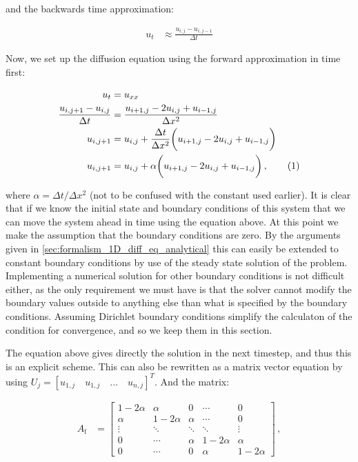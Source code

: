 \documentclass[reprint,english,notitlepage]{revtex4-1}  %
\newcommand\numberthis{\addtocounter{equation}{1}\tag{\theequation}}
\begin{document}
and the backwards time approximation:

\begin{align*}
u_t &\approx \frac{u_{i,j}- u_{i,j-1}}{\Delta t}
\end{align*}

Now, we set up the diffusion equation using the forward approximation in time first:

\begin{align*}
u_t &= u_{xx} \\
\frac{u_{i,j+1} - u_{i,j}}{\Delta t} &= \frac{u_{i+1,j} - 2u_{i,j} + u_{i-1,j}}{\Delta x^2}  \\
u_{i,j+1} &= u_{i,j} + \frac{\Delta t}{\Delta x^2} \bigg( u_{i+1,j} - 2u_{i,j} + u_{i-1,j} \bigg) \\
u_{i,j+1} &= u_{i,j} + \alpha \bigg( u_{i+1,j} - 2u_{i,j} + u_{i-1,j} \bigg) \, ,\numberthis \label{eq:forward_euler_method}
\end{align*}

where $\alpha = \Delta t /\Delta x^2$ (not to be confused with the constant used earlier). It is clear that if we know the initial state and boundary conditions of this system that we can move the system ahead in time using the equation above. At this point we make the assumption that the boundary conditions are zero. By the arguments given in \ref{sec:formalism_1D_diff_eq_analytical} this can easily be extended to constant boundary conditions by use of the steady state solution of the problem. Implementing a numerical solution for other boundary conditions is not difficult either, as the only requirement we must have is that the solver cannot modify the boundary values outside to anything else than what is specified by the boundary conditions. Assuming Dirichlet boundary conditions simplify the calculaton of the condition for convergence, and so we keep them in this section.

The equation above gives directly the solution in the next timestep, and thus this is an explicit scheme. This can also be rewritten as a matrix vector equation by using $U_j = [u_{1,j} \quad u_{1,j} \quad ... \quad u_{n,j} ] ^T$. And the matrix:

\begin{align*}
A_\text{f} &= \begin{bmatrix}
1 - 2\alpha & \alpha & 0   &\cdots & 0 \\
\alpha & 1-2\alpha & \alpha   & \cdots & 0 \\
\vdots & \ddots & \ddots & \ddots  & \vdots \\
0 & \cdots  & \alpha & 1 - 2\alpha & \alpha \\
0 & \cdots & 0 & \alpha & 1 - 2\alpha 
\end{bmatrix} \, ,
\end{align*}
\end{document}
